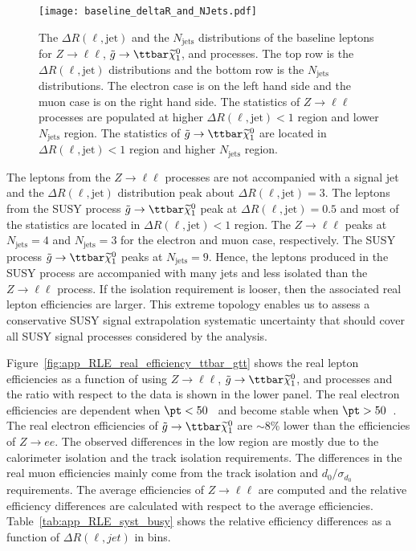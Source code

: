 \begin{figure}[htbp]
    \texttt{[image: baseline\_deltaR\_and\_NJets.pdf]}
    \caption{The $\Delta R(\ell, \mathrm{jet})$ and the $N_\mathrm{jets}$ distributions of the baseline leptons for $Z\to \ell\ell$, $\tilde{g} \to \ttbar \widetilde{\chi}^{0}_{1}$, and \ttbar processes.
    The top row is the $\Delta R(\ell, \mathrm{jet})$ distributions and the bottom row is the $N_\mathrm{jets}$ distributions.
    The electron case is on the left hand side and the muon case is on the right hand side.
    The statistics of $Z \to \ell \ell$ processes are populated at higher $\Delta R(\ell, \mathrm{jet}) < 1$ region and lower $N_\mathrm{jets}$ region.
    The statistics of $\tilde{g} \to \ttbar \widetilde{\chi}^{0}_{1}$ are located in $\Delta R(\ell, \mathrm{jet}) < 1$ region and higher $N_\mathrm{jets}$ region.}
    \label{fig:app_RLE_dRjet_Njet}
\end{figure}

The leptons from the $Z \to \ell \ell$ processes are not accompanied with a signal jet and the $\Delta R(\ell, \mathrm{jet})$ distribution peak about $\Delta R(\ell, \mathrm{jet}) = 3$.
The leptons from the SUSY process $\tilde{g} \to \ttbar \widetilde{\chi}^{0}_{1}$ peak at $\Delta R(\ell, \mathrm{jet}) = 0.5$ and most of the statistics are located in $\Delta R(\ell, \mathrm{jet}) < 1$ region.
The $Z \to \ell \ell$ peaks at $N_\mathrm{jets} = 4$ and $N_\mathrm{jets} = 3$ for the electron and muon case, respectively.
The SUSY process $\tilde{g} \to \ttbar \widetilde{\chi}^{0}_{1}$ peaks at $N_\mathrm{jets} = 9$.
Hence, the leptons produced in the SUSY process are accompanied with many jets and less isolated than the $Z \to \ell \ell$ process.
If the isolation requirement is looser, then the associated real lepton efficiencies are larger.
This extreme topology enables us to assess a conservative SUSY signal extrapolation systematic uncertainty that should cover all SUSY signal processes considered by the analysis.

Figure~\ref{fig:app_RLE_real_efficiency_ttbar_gtt} shows the real lepton efficiencies as a function of \pt using $Z\to \ell\ell$, $\tilde{g} \to \ttbar \widetilde{\chi}^{0}_{1}$, and \ttbar processes and the ratio with respect to the data is shown in the lower panel.
The real electron efficiencies are \pt dependent when $\pt < 50$~{\GeV} and become stable when $ \pt > 50$~{\GeV}.
The real electron efficiencies of $\tilde{g} \to \ttbar \widetilde{\chi}^{0}_{1}$ are $\sim$8\% lower than the efficiencies of $Z \to ee$.
The observed differences in the low \pt region are mostly due to the calorimeter isolation and the track isolation requirements.
The differences in the real muon efficiencies mainly come from the track isolation and $d_{0}/\sigma_{d_{0}}$ requirements.
The average efficiencies of $Z \to \ell \ell$ are computed and the relative efficiency differences are calculated  with respect to the average efficiencies.
Table~\ref{tab:app_RLE_syst_busy} shows the relative efficiency differences as a function of $\Delta R(\ell, jet)$ in  \pt bins.

